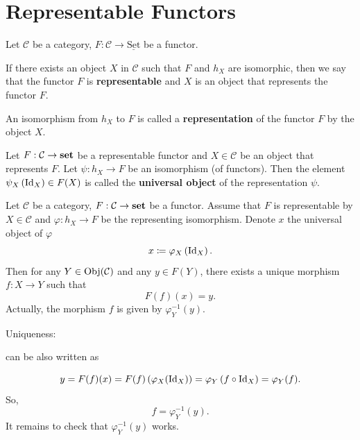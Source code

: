 \section{Representable Functors}
\begin{definitionenv}
    Let $\mathcal{C}$ be a category, $F:\mathcal{C}\rightarrow\underline{\mathrm{Set}}$ be a functor.
    
    \quad If there exists an object $X$ in $\mathcal{C}$ such that $F$ and $h_X$ are isomorphic, then we say that the functor $F$ is \textbf{representable} and $X$ is an object that represents the functor $F$.
    
    \quad An isomorphism from $h_X$ to $F$ is called a \textbf{representation} of the functor $F$ by the object $X$.

    \quad Let $F:\mathcal{C}\rightarrow \mathbf{set}$ be a representable functor and $X\in \mathcal{C}$ be an object that represents $F$. Let $\psi: h_X\rightarrow F$ be an isomorphism (of functors). Then the element $\psi_X\left(\operatorname{\mathrm{Id}}_X\right)\in F(X)$ is called the \textbf{universal object} of the representation $\psi$.
\end{definitionenv}
\begin{propositionenv}\label{1.5.2}
    Let $\mathcal{C}$ be a category, $F:\mathcal{C}\rightarrow\mathbf{set}$ be a functor. Assume that $F$ is representable by $X\in \mathcal{C}$ and $\varphi:h_X \rightarrow F$ be the representing isomorphism. Denote $x$ the universal object of $\varphi$
    $$ x\coloneq \varphi_X\left(\operatorname{\mathrm{Id}}_X\right).$$
    Then for any $Y\in \operatorname{\mathrm{Obj}}(\mathcal{C})$ and any $y\in F(Y)$, there exists a unique morphism $f:X\rightarrow Y$ such that
    $$
    F(f)(x) = y.
    $$
    Actually, the morphism $f$ is given by $\varphi^{-1}_{Y}(y)$.
\end{propositionenv}
\begin{proofenv}
    Uniqueness: 
\begin{center}
\end{center}
can be also written as
\begin{center}
\end{center}
$$
y = F(f)(x) = F(f) \left(\varphi_X(\operatorname{\mathrm{Id}}_X)\right) =\varphi_Y\left(f\circ\operatorname{\mathrm{Id}}_X\right) = \varphi_Y(f).
$$
So, $$f = \varphi_Y^{-1}(y).$$
It remains to check that $\varphi^{-1}_Y(y)$ works.
\end{proofenv}
